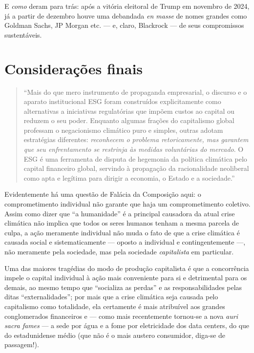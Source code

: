 \documentclass[12pt]{article}
\begin{document}
E \textit{como} deram para trás: após a vitória eleitoral de Trump em novembro de 2024, já a partir de dezembro houve uma debandada \textit{en masse} de nomes grandes como Goldman Sachs, JP Morgan etc. --- e, claro, Blackrock --- de seus compromissos sustentáveis. 



\section{Considerações finais}
\begin{quote}
    ``Mais do que mero instrumento de propaganda empresarial, o discurso e o aparato institucional ESG foram construídos explicitamente como alternativas a iniciativas regulatórias que impõem custos ao capital ou reduzem o seu poder. Enquanto algumas frações do capitalismo global professam o negacionismo climático puro e simples, outras adotam estratégias diferentes: \textit{reconhecem o problema retoricamente, mas garantem que seu enfrentamento se restrinja às medidas voluntárias do mercado}. O ESG é uma ferramenta de disputa de hegemonia da política climática pelo capital financeiro global, servindo à propagação da racionalidade neoliberal como apta e legítima para dirigir a economia, o Estado e a sociedade.''\cite[p. 82; grifo no original]{Telesforo2025}
\end{quote}

Evidentemente há uma questão de Falácia da Composição aqui: o comprometimento individual não garante que haja um comprometimento coletivo. Assim como dizer que ``a humanidade'' é a principal causadora da atual crise climática não implica que todos os seres humanos tenham a mesma parcela de culpa, a ação meramente individual não muda o fato de que a crise climática é causada social e sistematicamente --- oposto a individual e contingentemente ---, não meramente pela sociedade, mas pela sociedade \textit{capitalista} em particular.

Uma das maiores tragédias do modo de produção capitalista é que a concorrência impele o capital individual à ação mais conveniente para si e detrimental para os demais, ao mesmo tempo que “socializa as perdas” e as responsabilidades pelas ditas “externalidades”; por mais que a crise climática seja causada pelo capitalismo como totalidade, ela certamente é mais atribuível aos grandes conglomerados financeiros e — como mais recentemente tornou-se a nova \textit{auri sacra fames} — a sede por água e a fome por eletricidade dos data centers, do que do estadunidense médio (que não é o mais austero consumidor, diga-se de passagem!).
\end{document}
